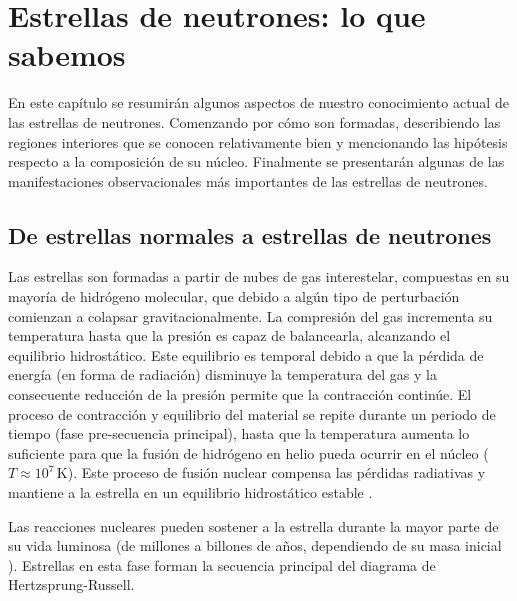 \chapter{Estrellas de neutrones: lo que sabemos}

\noindent En este capítulo se resumirán algunos aspectos de nuestro conocimiento actual de las estrellas de neutrones. Comenzando por cómo son formadas, describiendo las regiones interiores que se conocen relativamente bien y mencionando las hipótesis respecto a la composición de su núcleo. Finalmente se presentarán algunas de las manifestaciones observacionales más importantes de las estrellas de neutrones.


\section{De estrellas normales a estrellas de neutrones}

\noindent Las estrellas son formadas a partir de nubes de gas interestelar, compuestas en su mayoría de hidrógeno molecular, que debido a algún tipo de perturbación comienzan a colapsar gravitacionalmente. La compresión del gas incrementa su temperatura hasta que la presión es capaz de balancearla, alcanzando el equilibrio hidrostático. Este equilibrio es temporal debido a que la pérdida de energía (en forma de radiación) disminuye la temperatura del gas y la consecuente reducción de la presión permite que la contracción continúe. El proceso de contracción y equilibrio del material se repite durante un periodo de tiempo (fase pre-secuencia principal), hasta que la temperatura aumenta lo suficiente para que la fusión de hidrógeno en helio pueda ocurrir en el núcleo ($T\approx 10^7\,\si{\kelvin}$). Este proceso de fusión nuclear compensa las pérdidas radiativas y mantiene a la estrella en un equilibrio hidrostático estable \cite{Scilla2016}.

Las reacciones nucleares pueden sostener a la estrella durante la mayor parte de su vida luminosa (de millones a billones de años, dependiendo de su masa inicial \cite{Salaris2005}). Estrellas en esta fase forman la secuencia principal del diagrama de Hertzsprung-Russell.

